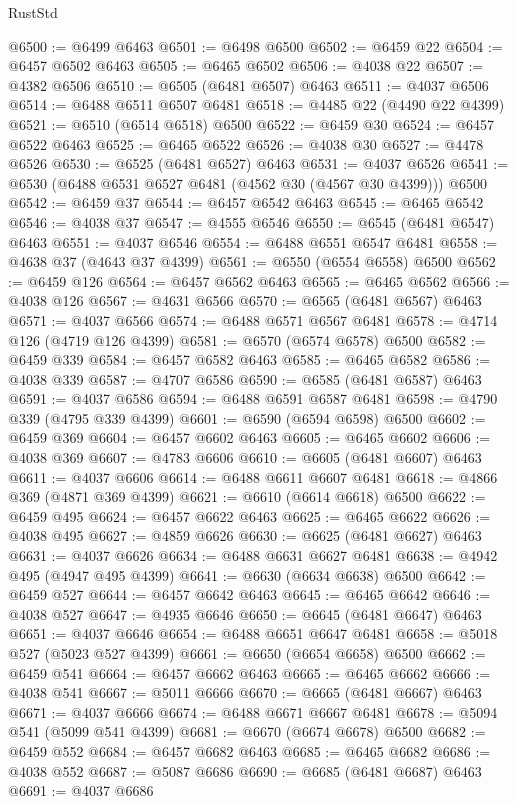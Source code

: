 \begin{lexlean}{RustStd}
\begin{coremodule}
@6500 := @6499 @6463
@6501 := @6498 @6500
@6502 := @6459 @22
@6504 := @6457 @6502 @6463
@6505 := @6465 @6502
@6506 := @4038 @22
@6507 := @4382 @6506
@6510 := @6505 (@6481 @6507) @6463
@6511 := @4037 @6506
@6514 := @6488 @6511 @6507 @6481
@6518 := @4485 @22 (@4490 @22 @4399)
@6521 := @6510 (@6514 @6518) @6500
@6522 := @6459 @30
@6524 := @6457 @6522 @6463
@6525 := @6465 @6522
@6526 := @4038 @30
@6527 := @4478 @6526
@6530 := @6525 (@6481 @6527) @6463
@6531 := @4037 @6526
@6541 := @6530 (@6488 @6531 @6527 @6481 (@4562 @30 (@4567 @30 @4399))) @6500
@6542 := @6459 @37
@6544 := @6457 @6542 @6463
@6545 := @6465 @6542
@6546 := @4038 @37
@6547 := @4555 @6546
@6550 := @6545 (@6481 @6547) @6463
@6551 := @4037 @6546
@6554 := @6488 @6551 @6547 @6481
@6558 := @4638 @37 (@4643 @37 @4399)
@6561 := @6550 (@6554 @6558) @6500
@6562 := @6459 @126
@6564 := @6457 @6562 @6463
@6565 := @6465 @6562
@6566 := @4038 @126
@6567 := @4631 @6566
@6570 := @6565 (@6481 @6567) @6463
@6571 := @4037 @6566
@6574 := @6488 @6571 @6567 @6481
@6578 := @4714 @126 (@4719 @126 @4399)
@6581 := @6570 (@6574 @6578) @6500
@6582 := @6459 @339
@6584 := @6457 @6582 @6463
@6585 := @6465 @6582
@6586 := @4038 @339
@6587 := @4707 @6586
@6590 := @6585 (@6481 @6587) @6463
@6591 := @4037 @6586
@6594 := @6488 @6591 @6587 @6481
@6598 := @4790 @339 (@4795 @339 @4399)
@6601 := @6590 (@6594 @6598) @6500
@6602 := @6459 @369
@6604 := @6457 @6602 @6463
@6605 := @6465 @6602
@6606 := @4038 @369
@6607 := @4783 @6606
@6610 := @6605 (@6481 @6607) @6463
@6611 := @4037 @6606
@6614 := @6488 @6611 @6607 @6481
@6618 := @4866 @369 (@4871 @369 @4399)
@6621 := @6610 (@6614 @6618) @6500
@6622 := @6459 @495
@6624 := @6457 @6622 @6463
@6625 := @6465 @6622
@6626 := @4038 @495
@6627 := @4859 @6626
@6630 := @6625 (@6481 @6627) @6463
@6631 := @4037 @6626
@6634 := @6488 @6631 @6627 @6481
@6638 := @4942 @495 (@4947 @495 @4399)
@6641 := @6630 (@6634 @6638) @6500
@6642 := @6459 @527
@6644 := @6457 @6642 @6463
@6645 := @6465 @6642
@6646 := @4038 @527
@6647 := @4935 @6646
@6650 := @6645 (@6481 @6647) @6463
@6651 := @4037 @6646
@6654 := @6488 @6651 @6647 @6481
@6658 := @5018 @527 (@5023 @527 @4399)
@6661 := @6650 (@6654 @6658) @6500
@6662 := @6459 @541
@6664 := @6457 @6662 @6463
@6665 := @6465 @6662
@6666 := @4038 @541
@6667 := @5011 @6666
@6670 := @6665 (@6481 @6667) @6463
@6671 := @4037 @6666
@6674 := @6488 @6671 @6667 @6481
@6678 := @5094 @541 (@5099 @541 @4399)
@6681 := @6670 (@6674 @6678) @6500
@6682 := @6459 @552
@6684 := @6457 @6682 @6463
@6685 := @6465 @6682
@6686 := @4038 @552
@6687 := @5087 @6686
@6690 := @6685 (@6481 @6687) @6463
@6691 := @4037 @6686

\end{coremodule}
\end{lexlean}
